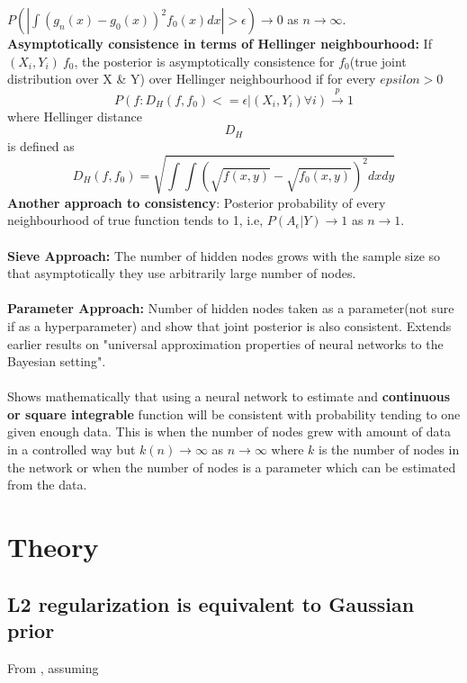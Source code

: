\documentclass[a4paper, twocolumn]{article}
\begin{document}
\( P(|\int(\hat{g_n}(x) - g_0(x))^2f_0(x)dx| > \epsilon) \rightarrow 0 \) as \( n \rightarrow \infty\).
\\
\textbf{Asymptotically consistence in terms of Hellinger neighbourhood:} If \( (X_i, Y_i) ~ f_0 \), the posterior is asymptotically consistence for \(f_0\)(true joint distribution over X \& Y) over Hellinger neighbourhood if for every \(epsilon>0\)
\begin{equation}
    P({f: D_H(f,f_0) <= \epsilon}|(X_i, Y_i) \forall i) \xrightarrow{p} 1
\end{equation}
where Hellinger distance $$D_H$$ is defined as 
\begin{equation*}
    D_H(f, f_0) = \sqrt{\int\int(\sqrt{f(x, y)}-\sqrt{f_0(x, y)})^2 dx dy}
\end{equation*}
\textbf{Another approach to consistency}: Posterior probability of every neighbourhood of true function tends to 1, i.e, \(P(A_\epsilon|Y) \longrightarrow 1\) as \(n\rightarrow{}1\).
\\\\
\textbf{Sieve Approach:} The number of hidden nodes grows with the sample size so that asymptotically they use arbitrarily large number of nodes.
\\\\
\textbf{Parameter Approach:} Number of hidden nodes taken as a parameter(not sure if as a hyperparameter) and show that joint posterior is also consistent.
Extends earlier results on "universal approximation properties of neural networks to the Bayesian setting".
\\\\
Shows mathematically that using a neural network to estimate and \textbf{continuous or square integrable} function will be consistent with probability tending to one given enough data. This is when the number of nodes grew with amount of data in a controlled way but \(k(n) \xrightarrow{} \infty\) as \(n \xrightarrow{} \infty\) where \(k\) is the number of nodes in the network or when the number of nodes is a parameter which can be estimated from the data.    

\section{Theory}
\label{sec-4}

\subsection{L2 regularization is equivalent to Gaussian prior}
\label{sec-4-1}
From \cite{adaptiveSparseness}, assuming 
\end{document}
